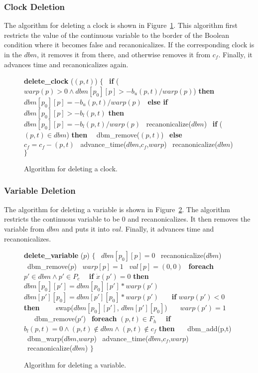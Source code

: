 \documentclass[11pt,times]{article}
\begin{document}
\subsubsection{Clock Deletion}

The algorithm for deleting a clock is shown in
Figure~\ref{delete_clock}.  This algorithm first restricts the value of
the continuous variable to the border of the Boolean condition where it
becomes false and recanonicalizes.  If the corresponding clock is in the
$dbm$, it removes it from there, and otherwise removes it from $c_f$.
Finally, it advances time and recanonicalizes again.

  \begin{figure}[htbp]
    \begin{algorithm}
      \small {\bf{delete\_clock}} ($(p, t)$) $\{$
      \ {\bf{if}} ($warp(p) > 0 \wedge dbm[p_0][p] > -b_u(p, t) / warp(p)$) {\bf{then}}
      \ \ $dbm[p_0][p] = -b_u(p, t) / warp(p)$
      \ {\bf{else if}} $dbm[p_0][p] > -b_l(p, t)$ {\bf{then}}
      \ \ $dbm[p_0][p] = -b_l(p, t) / warp(p)$
      \ recanonicalize($dbm$)
      \ {\bf{if}} ($(p, t) \in dbm$) {\bf{then}}
      \ \ dbm\_remove($(p, t)$)
      \ {\bf{else}}
      \ \ $c_f = c_f - (p, t)$
      \ advance\_time($dbm$,$c_f$,$warp$)
      \ recanonicalize($dbm$)
      $\}$    
    \end{algorithm}
    \caption{\label{delete_clock}Algorithm for deleting a clock.}
  \end{figure}

\subsubsection{Variable Deletion}

The algorithm for deleting a variable is shown in
Figure~\ref{delete_variable}.  The algorithm restricts the continuous variable
to be 0 and recanonicalizes.  It then removes the variable from $dbm$ and 
puts it into $val$.  Finally, it advances time and recanonicalizes.

  \begin{figure}[htbp]
    \begin{algorithm}
      \small {\bf{delete\_variable}} ($p$) $\{$
      \ $dbm[p_0][p] = 0$
      \ recanonicalize($dbm$)
      \ dbm\_remove($p$)
      \ $warp[p] = 1$
      \ $val[p] = (0, 0)$
      \ {\bf{foreach}} $p' \in dbm \wedge p' \in P_c$
      \ \ {\bf{if}} $\dot{x}(p') = 0$ {\bf{then}}
      \ \ \ $dbm[p_0][p'] = dbm[p_0][p'] * warp(p')$
      \ \ \ $dbm[p'][p_0] = dbm[p'][p_0] * warp(p')$
      \ \ \ {\bf{if}} $warp(p') < 0$ {\bf{then}}
      \ \ \ \ swap($dbm[p_0][p']$, $dbm[p'][p_0]$)
      \ \ \ $warp(p') = 1$
      \ \ \ dbm\_remove($p'$)
      \ {\bf{foreach}} $(p,t) \in F_h$
      \ \ {\bf{if}} $b_l(p,t) = 0 \wedge (p,t) \not \in dbm \wedge (p,t) \not \in c_f $ {\bf{then}}
      \ \ \ dbm\_add(p,t)
      \ dbm\_warp($dbm$,$warp$)
      \ advance\_time($dbm$,$c_f$,$warp$)
      \ recanonicalize($dbm$)
      $\}$    
    \end{algorithm}
    \caption{\label{delete_variable}Algorithm for deleting a variable.}
  \end{figure}
  
\end{document}
